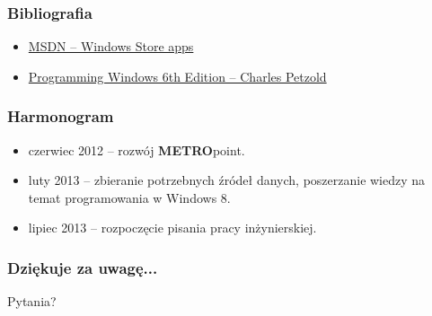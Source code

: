 \documentclass{beamer}
\begin{document}
\begin{frame}
\frametitle{Bibliografia} 
\begin{itemize}
\item \href{http://msdn.microsoft.com/en-us/windows/apps/}{MSDN -- Windows Store apps}
\item \href{http://www.charlespetzold.com/blog/2013/01/Programming-Windows-6th-Edition-Final-Ebook-Now-Available.html}{Programming Windows 6th Edition -- Charles Petzold}
\end{itemize}
\end{frame}


\begin{frame}
\frametitle{Harmonogram} 
\begin{itemize}
\item czerwiec 2012 -- rozwój \textbf{METRO}point.
\item luty 2013 -- zbieranie potrzebnych źródeł danych, poszerzanie wiedzy na temat programowania w Windows 8.
\item lipiec 2013 -- rozpoczęcie pisania pracy inżynierskiej.
\end{itemize}
\end{frame}


\begin{frame}
\frametitle{Dziękuje za uwagę...}
Pytania?

\end{frame}
\end{document}
